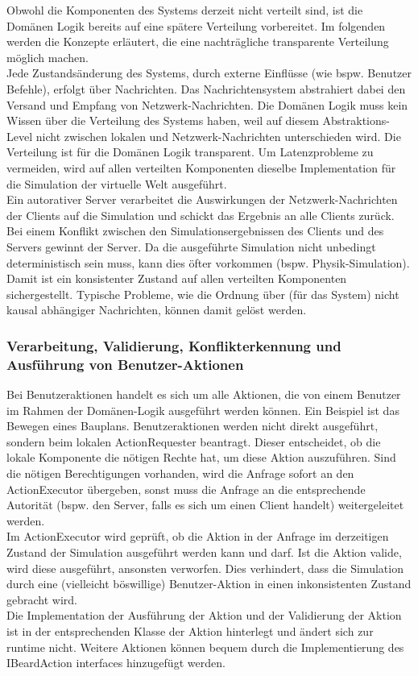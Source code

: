 Obwohl die Komponenten des Systems derzeit nicht verteilt sind, ist die Domänen Logik bereits auf eine spätere Verteilung vorbereitet. Im folgenden werden die Konzepte erläutert, die eine nachträgliche transparente Verteilung möglich machen.\\
Jede Zustandsänderung des Systems, durch externe Einflüsse (wie bspw. Benutzer Befehle), erfolgt über Nachrichten. Das Nachrichtensystem abstrahiert dabei den Versand und Empfang von Netzwerk-Nachrichten. Die Domänen Logik muss kein Wissen über die Verteilung des Systems haben, weil auf diesem Abstraktions-Level nicht zwischen lokalen und Netzwerk-Nachrichten unterschieden wird. Die Verteilung ist für die Domänen Logik transparent. Um Latenzprobleme zu vermeiden, wird auf allen verteilten Komponenten dieselbe Implementation für die Simulation der virtuelle Welt ausgeführt.\\
Ein autorativer Server verarbeitet die Auswirkungen der Netzwerk-Nachrichten der Clients auf die Simulation und schickt das Ergebnis an alle Clients zurück. Bei einem Konflikt zwischen den Simulationsergebnissen des Clients und des Servers gewinnt der Server. Da die ausgeführte Simulation nicht unbedingt deterministisch sein muss, kann dies öfter vorkommen (bspw. Physik-Simulation). Damit ist ein konsistenter Zustand auf allen verteilten Komponenten sichergestellt. Typische Probleme, wie die Ordnung über (für das System) nicht kausal abhängiger Nachrichten, können damit gelöst werden.

\subsubsection{Verarbeitung, Validierung, Konflikterkennung und Ausführung von Benutzer-Aktionen}


Bei Benutzeraktionen handelt es sich um alle Aktionen, die von einem Benutzer im Rahmen der Domänen-Logik ausgeführt werden können. Ein Beispiel ist das Bewegen eines Bauplans. Benutzeraktionen werden nicht direkt ausgeführt, sondern beim lokalen ActionRequester beantragt. Dieser entscheidet, ob die lokale Komponente die nötigen Rechte hat, um diese Aktion auszuführen. Sind die nötigen Berechtigungen vorhanden, wird die Anfrage sofort an den ActionExecutor übergeben, sonst muss die Anfrage an die entsprechende Autorität (bspw. den Server, falls es sich um einen Client handelt) weitergeleitet werden.\\
Im ActionExecutor wird geprüft, ob die Aktion in der Anfrage im derzeitigen Zustand der Simulation ausgeführt werden kann und darf. Ist die Aktion valide, wird diese ausgeführt, ansonsten verworfen. Dies verhindert, dass die Simulation durch eine (vielleicht böswillige) Benutzer-Aktion in einen inkonsistenten Zustand gebracht wird.\\
Die Implementation der Ausführung der Aktion und der Validierung der Aktion ist in der entsprechenden Klasse der Aktion hinterlegt und ändert sich zur runtime nicht. Weitere Aktionen können bequem durch die Implementierung des IBeardAction interfaces hinzugefügt werden.

